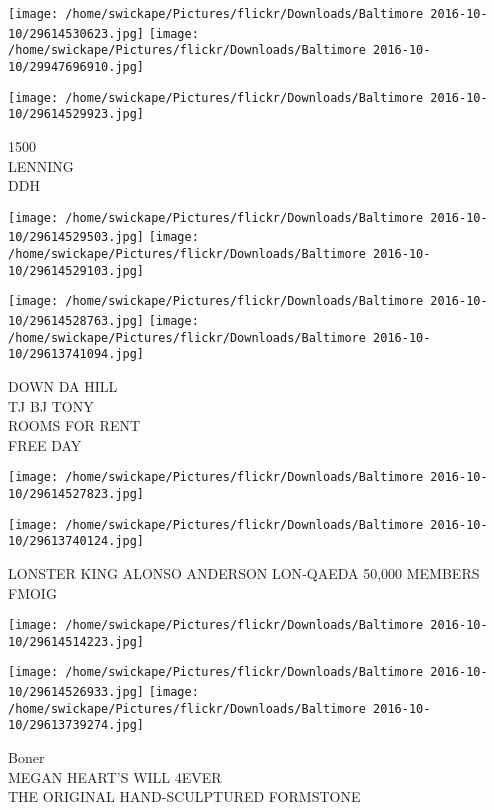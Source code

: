 \documentclass[10pt,letterpaper]{article}
\begin{document}
\texttt{[image: /home/swickape/Pictures/flickr/Downloads/Baltimore 2016-10-10/29614530623.jpg]}
\texttt{[image: /home/swickape/Pictures/flickr/Downloads/Baltimore 2016-10-10/29947696910.jpg]}

\vspace{0.25in}
\texttt{[image: /home/swickape/Pictures/flickr/Downloads/Baltimore 2016-10-10/29614529923.jpg]}

1500\\
LENNING\\
DDH\\
\pagebreak

\texttt{[image: /home/swickape/Pictures/flickr/Downloads/Baltimore 2016-10-10/29614529503.jpg]}
\texttt{[image: /home/swickape/Pictures/flickr/Downloads/Baltimore 2016-10-10/29614529103.jpg]}

\texttt{[image: /home/swickape/Pictures/flickr/Downloads/Baltimore 2016-10-10/29614528763.jpg]}
\texttt{[image: /home/swickape/Pictures/flickr/Downloads/Baltimore 2016-10-10/29613741094.jpg]}

DOWN DA HILL\\
TJ BJ TONY\\
ROOMS FOR RENT\\
FREE DAY\\
\pagebreak

\texttt{[image: /home/swickape/Pictures/flickr/Downloads/Baltimore 2016-10-10/29614527823.jpg]}

\vspace{0.25in}
\texttt{[image: /home/swickape/Pictures/flickr/Downloads/Baltimore 2016-10-10/29613740124.jpg]}

LONSTER KING ALONSO ANDERSON LON{-}QAEDA 50,000 MEMBERS\\
FMOIG\\
\pagebreak

\texttt{[image: /home/swickape/Pictures/flickr/Downloads/Baltimore 2016-10-10/29614514223.jpg]}

\vspace{0.25in}
\texttt{[image: /home/swickape/Pictures/flickr/Downloads/Baltimore 2016-10-10/29614526933.jpg]}
\texttt{[image: /home/swickape/Pictures/flickr/Downloads/Baltimore 2016-10-10/29613739274.jpg]}

Boner\\
MEGAN HEART'S WILL 4EVER\\
THE ORIGINAL HAND{-}SCULPTURED FORMSTONE\\
\pagebreak
\end{document}
